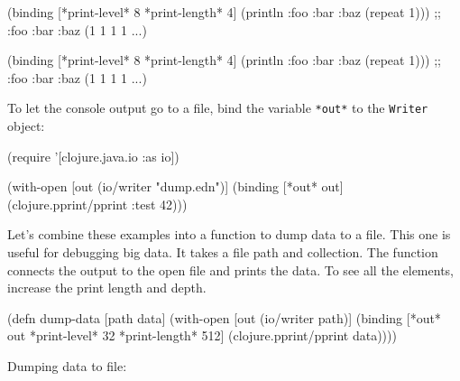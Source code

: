 \begin{english}
  \begin{clojure}
(binding [*print-level* 8
          *print-length* 4]
  (println
    {:foo {:bar {:baz (repeat 1)}}}))
;; {:foo {:bar {:baz (1 1 1 1 ...)}}}
  \end{clojure}
\end{english}

\else

\begin{english}
  \begin{clojure}
(binding [*print-level* 8
          *print-length* 4]
  (println {:foo {:bar {:baz (repeat 1)}}}))
;; {:foo {:bar {:baz (1 1 1 1 ...)}}}
  \end{clojure}
\end{english}

\fi


To let the console output go to a file, bind the variable \verb|*out*| to the
\verb|Writer| object:


\begin{english}
  \begin{clojure}
(require '[clojure.java.io :as io])

(with-open [out (io/writer "dump.edn")]
  (binding [*out* out]
    (clojure.pprint/pprint {:test 42})))
  \end{clojure}
\end{english}

Let's combine these examples into a function to dump data to a file.
This one is useful for debugging big data.
It takes a file path and collection.
The function connects the output to the open file and prints the data.
To see all the elements, increase the print length and depth.

\begin{english}
  \begin{clojure}
(defn dump-data
  [path data]
  (with-open [out (io/writer path)]
    (binding [*out* out
              *print-level* 32
              *print-length* 512]
      (clojure.pprint/pprint data))))
  \end{clojure}
\end{english}

\noindent
Dumping data to file:

\ifx\DEVICETYPE\MOBILE

